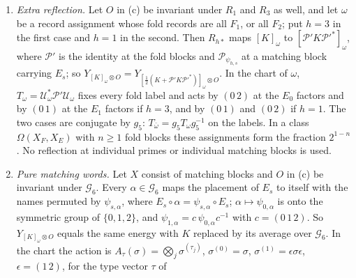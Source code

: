 \begin{lemma}
\begin{enumerate}[label=(\alph*)]
 $(1\,2)$ at the matching factors, and
 $g_5\operatorname{Lift}(D)g_5^*=\operatorname{Lift}(g_{5*}D)$ for the image $g_{5*}D$ of $D$
 under these label permutations. In the charts the normalized leading stars
 have one shape up to sign: $\mathcal U_\omega^*L\,\mathcal U_\omega$ is $\pm$ the star of
 \ref{it:env:N1} (centre $0$, arms $1,2,3$, signed coefficients) at a fold factor,
 and $\pm$ the one-arm star of \ref{it:env:N3} between $0$ and $1$ at a matching
 factor. If $K_\omega=\mathcal U_\omega K\mathcal U_\omega^*$ for one operator $K$ for all
 $\omega$ with the same fold and matching blocks, then
 $K_{\bar\omega}=\mathcal T_\omega K_\omega\mathcal T_\omega^*$ and
 $\frac12(K_\omega+g_\omega K_\omega g_\omega^*)=\mathcal U_\omega\,\frac12(K+g_5Kg_5^*)\,
 \mathcal U_\omega^*$.
\item \emph{Extra reflection.} Let $O$ in (c) be invariant under $R_1$ and $R_3$ as
 well, and let $\omega$ be a record assignment whose fold records are all $F_1$, or
 all $F_2$; put $h=3$ in the first case and $h=1$ in the second. Then $R_{h*}$
 maps $[K]_\omega$ to $[\mathcal P'K\mathcal P'^*]_\omega$, where $\mathcal P'$ is the identity
 at the fold blocks and $\mathcal P_{\psi_{h,s}}$ at a matching block carrying $E_s$; so
 $Y_{[K]_\omega\otimes O}=Y_{[\frac12(K+\mathcal P'K\mathcal P'^*)]_\omega\otimes O}$. In the chart
 of $\omega$, $T_\omega=\mathcal U_\omega^*\mathcal P'\mathcal U_\omega$ fixes every fold label and
 acts by $(0\,2)$ at the $E_0$ factors and by $(0\,1)$ at the $E_1$ factors if
 $h=3$, and by $(0\,1)$ and $(0\,2)$ if $h=1$. The two cases are conjugate by $g_5$:
 $T_{\bar\omega}=g_5T_\omega g_5^{-1}$ on the labels. In a class $\Omega(X_F,X_E)$ with
 $n\ge1$ fold blocks these assignments form the fraction $2^{1-n}$. No reflection
 at individual primes or individual matching blocks is used.
\item \emph{Pure matching words.} Let $X$ consist of matching blocks and $O$ in (c)
 be invariant under $\mathcal G_6$. Every $\alpha\in\mathcal G_6$ maps the placement of
 $E_s$ to itself with the names permuted by $\psi_{s,\alpha}$, where
 $E_s\circ\alpha=\psi_{s,\alpha}\circ E_s$; $\alpha\mapsto\psi_{0,\alpha}$ is onto the
 symmetric group of $\{0,1,2\}$, and $\psi_{1,\alpha}=c\,\psi_{0,\alpha}c^{-1}$ with
 $c=(0\,1\,2)$. So $Y_{[K]_\omega\otimes O}$ equals the same energy with $K$ replaced by
 its average over $\mathcal G_6$. In the chart the action is
 $A_\tau(\sigma)=\bigotimes_j\sigma^{(\tau_j)}$, $\sigma^{(0)}=\sigma$,
 $\sigma^{(1)}=\epsilon\sigma\epsilon$, $\epsilon=(1\,2)$, for the type vector $\tau$ of

\end{enumerate}
\end{lemma}
